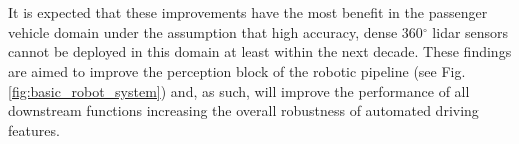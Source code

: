 \\\\
It is expected that these improvements have the most benefit in the passenger vehicle domain under the assumption that high accuracy, dense 360$^{\circ}$ lidar sensors cannot be deployed in this domain at least within the next decade. These findings are aimed to improve the perception block of the robotic pipeline (see Fig. \ref{fig:basic_robot_system}) and, as such, will improve the performance of all downstream functions increasing the overall robustness of automated driving features.
